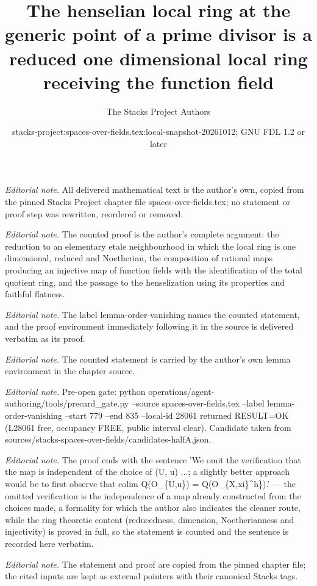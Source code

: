 \documentclass[10pt,a4paper]{amsart}
\title{The henselian local ring at the generic point of a prime divisor is a reduced one dimensional local ring receiving the function field}
\author{The Stacks Project Authors}
\date{stacks-project:spaces-over-fields.tex:local-snapshot-20261012; GNU FDL 1.2 or later}
\theoremstyle{plain}
\theoremstyle{definition}
\theoremstyle{remark}
\numberwithin{equation}{subsection}
\begin{document}
\maketitle
\noindent\textit{Editorial note.} All delivered mathematical text is the author's own, copied from the pinned Stacks Project chapter file spaces-over-fields.tex; no statement or proof step was rewritten, reordered or removed.\par\medskip
\noindent\textit{Editorial note.} The counted proof is the author's complete argument: the reduction to an elementary etale neighbourhood in which the local ring is one dimensional, reduced and Noetherian, the composition of rational maps producing an injective map of function fields with the identification of the total quotient ring, and the passage to the henselization using its properties and faithful flatness.\par\medskip
\noindent\textit{Editorial note.} The label lemma-order-vanishing names the counted statement, and the proof environment immediately following it in the source is delivered verbatim as its proof.\par\medskip
\noindent\textit{Editorial note.} The counted statement is carried by the author's own lemma environment in the chapter source.\par\medskip
\noindent\textit{Editorial note.} Pre-open gate: python operations/agent-authoring/tools/precard\_gate.py --source spaces-over-fields.tex --label lemma-order-vanishing --start 779 --end 835 --local-id 28061 returned RESULT=OK (L28061 free, occupancy FREE, public interval clear). Candidate taken from sources/stacks-spaces-over-fields/candidates-halfA.json.\par\medskip
\noindent\textit{Editorial note.} The proof ends with the sentence 'We omit the verification that the map is independent of the choice of (U, u) ...; a slightly better approach would be to first observe that colim Q(O\_\{U,u\}) = Q(O\_\{X,xi\}\textasciicircum{}h\}).' — the omitted verification is the independence of a map already constructed from the choices made, a formality for which the author also indicates the cleaner route, while the ring theoretic content (reducedness, dimension, Noetherianness and injectivity) is proved in full, so the statement is counted and the sentence is recorded here verbatim.\par\medskip
\noindent\textit{Editorial note.} The statement and proof are copied from the pinned chapter file; the cited inputs are kept as external pointers with their canonical Stacks tags.\par\medskip
\end{document}
